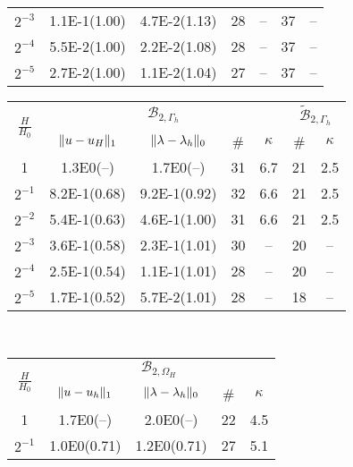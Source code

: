 \begin{table}
{\begin{minipage}{0.49\textwidth}
\begin{center}
\begin{tabular}{c|cccc||cc}
$2^{-3}$ & 1.1E-1(1.00) & 4.7E-2(1.13)& 28 & --   & 37 & --   \\
$2^{-4}$ & 5.5E-2(1.00) & 2.2E-2(1.08)& 28 & --   & 37 & --   \\
$2^{-5}$ & 2.7E-2(1.00) & 1.1E-2(1.04)& 27 & --   & 37 & --   \\
\hline
  \end{tabular}
  \end{center}
  \end{minipage}
  }
    \scriptsize{%
    \begin{minipage}{0.49\textwidth}
  \begin{center}
    \begin{tabular}{c|cccc||cc}
      \hline
      \multirow{2}{*}{$\frac{H}{H_0}$} & \multicolumn{4}{c||}{$\mathcal{B}_{2, \Gamma_h}$} & \multicolumn{2}{c}{$\tilde{\mathcal{B}}_{2, \Gamma_h}$}\\
      \cline{2-7}
      & $\lVert{u-u_H}\rVert_1$ & $\lVert{\lambda-\lambda_h}\rVert_0$ & \# & $\kappa$ & \# & $\kappa$\\
      \hline
1       & 1.3E0(--)   & 1.7E0(--)    & 31 & 6.7 & 21 & 2.5\\
$2^{-1}$ &8.2E-1(0.68) & 9.2E-1(0.92)  & 32 & 6.6 & 21 & 2.5\\
$2^{-2}$ &5.4E-1(0.63) & 4.6E-1(1.00)  & 31 & 6.6 & 21 & 2.5\\
$2^{-3}$ &3.6E-1(0.58) & 2.3E-1(1.01)  & 30 & --  & 20 & --  \\
$2^{-4}$ &2.5E-1(0.54) & 1.1E-1(1.01)  & 28 & --  & 20 & --  \\
$2^{-5}$ &1.7E-1(0.52) & 5.7E-2(1.01)  & 28 & --  & 18 & --  \\
      \hline
  \end{tabular}
  \end{center}
  \end{minipage}
    }
    \vspace{5pt}
    \\
  \scriptsize{%
    \begin{minipage}{0.49\textwidth}
  \begin{center}
    \begin{tabular}{c|cccc}
      \hline
      \multirow{2}{*}{$\frac{H}{H_0}$} & \multicolumn{4}{c}{$\mathcal{B}_{2, \Omega_H}$}\\
      \cline{2-5}
      & $\lVert{u-u_h}\rVert_1$ & $\lVert{\lambda-\lambda_h}\rVert_0$ & \# & $\kappa$\\
      \hline
1       & 1.7E0(--)    & 2.0E0(--)    & 22 &4.5\\
$2^{-1}$ & 1.0E0(0.71)  & 1.2E0(0.71)  & 27 &5.1\\

\end{tabular}
\end{center}
\end{minipage}}
\end{table}
